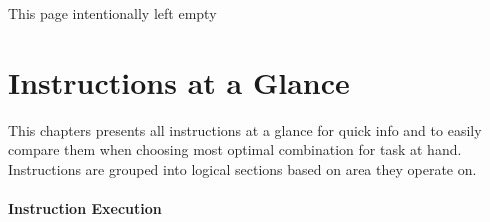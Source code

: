 \documentclass[12pt,twoside,openright,a4paper]{book}
\newcommand{\intentiallyempty}{
	\mbox{}
	\vfill
	\begin{center}
	This page intentionally left empty
	\end{center}
	\vfill
	\mbox{}
}
\begin{document}
\pagebreak
\intentiallyempty
\pagebreak


\chapter{Instructions at a Glance}


This chapters presents all instructions at a glance for quick info and to easily compare them when choosing most optimal combination for task at hand. Instructions are grouped into logical sections based on area they operate on.

\minitoc

\pagebreak

\newcommand{\FS}{$\updownarrow$} %
\newcommand{\FN}{-} %
\newcommand{\FU}{?} %
\newcommand{\FX}{$\bullet$}
\newcommand{\FPV}{VF} %
\newcommand{\FPP}{PF} %

\subsubsection{Instruction Execution}
\end{document}
